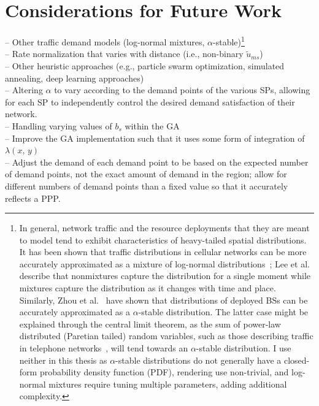 \documentclass[12pt,dvipsnames]{report}
\begin{document}
\section{Considerations for Future Work} \label{sec:futurework}

\noindent -- Other traffic demand models (log-normal mixtures, $\alpha$-stable)\footnote{In general, network traffic and the resource deployments that they are meant to model tend to exhibit characteristics of heavy-tailed spatial distributions.  It has been shown that traffic distributions in cellular networks can be more accurately approximated as a mixture of log-normal distributions~\cite{5936263, 6757900}; Lee et al.~\cite{6757900} describe that nonmixtures capture the distribution for a single moment while mixtures capture the distribution as it changes with time and place.  Similarly, Zhou et al.~\cite{7202841} have shown that distributions of deployed BSs can be accurately approximated as a $\alpha$-stable distribution.  The latter case might be explained through the central limit theorem, as the sum of power-law distributed (Paretian tailed) random variables, such as those describing traffic in telephone networks~\cite{PhysRevE.72.026116}, will tend towards an $\alpha$-stable distribution.  I use neither in this thesis as $\alpha$-stable distributions do not generally have a closed-form probability density function (PDF), rendering use non-trivial, and log-normal mixtures require tuning multiple parameters, adding additional complexity.}\\%
-- Rate normalization that varies with distance (i.e., non-binary $\tilde{u}_{ms}$)\\%
-- Other heuristic approaches (e.g., particle swarm optimization, simulated annealing, deep learning approaches)\\%
--  Altering $\alpha$ to vary according to the demand points of the various SPs, allowing for each SP to independently control the desired demand satisfaction of their network.\\%
-- Handling varying values of $b_s$ within the GA\\%
-- Improve the GA implementation such that it uses some form of integration of $\lambda\left( x,\, y \right)$\\%
-- Adjust the demand of each demand point to be based on the expected number of demand points, not the exact amount of demand in the region; allow for different numbers of demand points than a fixed value so that it accurately reflects a PPP.
\fi
\end{document}

